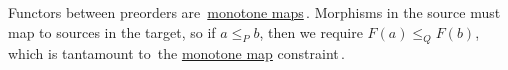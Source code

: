 Functors between preorders are \,\href{doc/1 math/Seven Sketches in Compositionality/Chapter 1: Generative Effects/4 Monotone maps/1 Monotone map}{monotone maps}\,. Morphisms in the source must map to sources in the target, so if $a \leq_P b$, then we require $F(a) \leq_Q F(b)$, which is tantamount to \,the \href{doc/1 math/Seven Sketches in Compositionality/Chapter 1: Generative Effects/4 Monotone maps/1 Monotone map}{monotone map} constraint\,.
